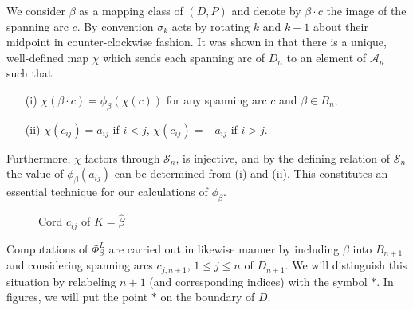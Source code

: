 \documentclass[11pt]{amsart}
\def\A{{\mathcal A}}
\def\s{{\sigma}}
\theoremstyle{definition}
\begin{document}
We consider $\beta$ as a mapping class of $(D,P)$ and denote by $\beta\cdot c$ the image of the spanning arc $c$. By convention $\s_k$ acts by rotating $k$ and $k+1$ about their midpoint in counter-clockwise fashion. It was shown in \cite[Section 2]{Ng05b} that there is a unique, well-defined map $\chi$ which sends each spanning arc of $D_n$ to an element of $\A_n$ such that 
    \begin{itemize}
      \item[(i)] $\chi(\beta\cdot c) = \phi_{\beta}(\chi(c))$ for any spanning arc $c$ and $\beta\in B_n$;
      \item[(ii)] $\chi(c_{ij})=a_{ij}$ if $i<j$, $\chi(c_{ij})=-a_{ij}$ if $i>j$.
    \end{itemize}
Furthermore, $\chi$ factors through $\mathscr S_n$, is injective, and by the defining relation of $\mathscr S_n$ the value of $\phi_{\beta}(a_{ij})$ can be determined from (i) and (ii). This constitutes an essential technique for our calculations of $\phi_\beta$.

    \begin{figure}[ht]
    \caption{Cord $c_{ij}$ of $K=\hat \beta$}
    \label{FigA_nGens}
    \end{figure} 
  Computations of $\Phi_\beta^L$ are carried out in likewise manner by including $\beta$ into $B_{n+1}$ and considering spanning arcs $c_{j,n+1}$, $1\le j\le n$ of $D_{n+1}$. We will distinguish this situation by relabeling $n+1$ (and corresponding indices) with the symbol $\ast$. In figures, we will put the point $\ast$ on the boundary of $D$.
\end{document}
